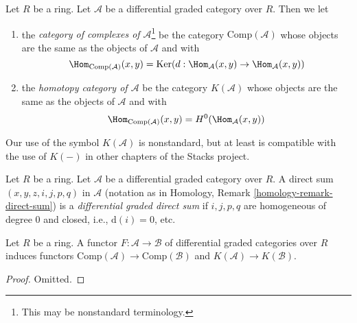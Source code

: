 \begin{definition}
\label{definition-homotopy-category-of-dga-category}
Let $R$ be a ring. Let $\mathcal{A}$ be a differential graded category
over $R$. Then we let
\begin{enumerate}
\item the {\it category of complexes of $\mathcal{A}$}\footnote{This may
be nonstandard terminology.} be the category
$\text{Comp}(\mathcal{A})$ whose objects are the same as the objects
of $\mathcal{A}$ and with
$$
\Hom_{\text{Comp}(\mathcal{A})}(x, y) =
\text{Ker}(d : \Hom_\mathcal{A}(x, y) \to \Hom_\mathcal{A}(x, y))
$$
\item the {\it homotopy category of $\mathcal{A}$} be the category
$K(\mathcal{A})$ whose objects are the same as the objects
of $\mathcal{A}$ and with
$$
\Hom_{\text{Comp}(\mathcal{A})}(x, y) = H^0(\Hom_\mathcal{A}(x, y))
$$
\end{enumerate}
\end{definition}

\noindent
Our use of the symbol $K(\mathcal{A})$ is nonstandard, but at least
is compatible with the use of $K(-)$ in other chapters of the Stacks project.

\begin{definition}
\label{definition-dg-direct-sum}
Let $R$ be a ring. Let $\mathcal{A}$ be a differential graded category over
$R$. A direct sum $(x, y, z, i, j, p, q)$ in $\mathcal{A}$ (notation as in
Homology, Remark \ref{homology-remark-direct-sum})
is a {\it differential graded direct sum} if $i, j, p, q$ are homogeneous
of degree $0$ and closed, i.e., $\text{d}(i) = 0$, etc.
\end{definition}

\begin{lemma}
\label{lemma-functorial}
Let $R$ be a ring. A functor
$F : \mathcal{A} \to \mathcal{B}$
of differential graded categories over $R$
induces functors $\text{Comp}(\mathcal{A}) \to \text{Comp}(\mathcal{B})$
and $K(\mathcal{A}) \to K(\mathcal{B})$.
\end{lemma}

\begin{proof}
Omitted.
\end{proof}

